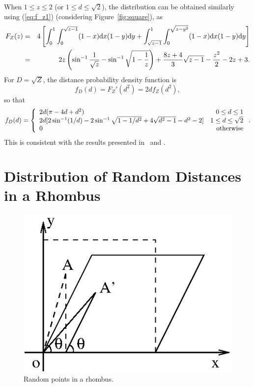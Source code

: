 \documentclass[12pt,draftclsnofoot,onecolumn]{IEEEtran}
\begin{document}
When $1\leq z\leq 2$ (or $1\leq d\leq\sqrt{2}$), the distribution can be obtained
similarly using (\ref{eq:f_z1}) (considering Figure~\ref{fig:square}), as
\begin{eqnarray}
F_Z(z)&=&4\left[\int_{0}^{1}\int_{0}^{\sqrt{z-1}}(1-x){\rm d}x(1-y){\rm
d}y+\int_{\sqrt{z-1}}^1\int_{0}^{\sqrt{z-y^2}}(1-x){\rm d}x(1-y){\rm d}y\right] \nonumber\\
&=&2z\left(\sin^{-1}\frac{1}{\sqrt{z}}-\sin^{-1}\sqrt{1-\frac{1}{z}}\right)+\frac{8z+4}{3}\sqrt{z-1}
-\frac{z^2}{2}-2z+3.\nonumber
\end{eqnarray}
For $D=\sqrt{Z}$, the distance probability density function is
\begin{equation}\label{eq:fd-fz}
f_D(d)=F_Z'(d^2)=2df_Z(d^2),
\end{equation}
so that
\begin{equation}
  f_{D}(d)=\left\{
    \begin{array}{lr}
      2d(\pi-4d+d^2) & 0\leq d\leq 1\\
      2d[2\sin^{-1}(1/d)-2\sin^{-1}\sqrt{1-1/d^2}+4\sqrt{d^2-1}-d^2-2] & 1\leq d\leq \sqrt{2} \\
      0 & {\rm otherwise} \nonumber
    \end{array}
  \right..
\end{equation}
This is consistent with the results presented in~\cite{ghosh1943distribution} and \cite{ghosh1943random}.

\section{Distribution of Random Distances in a Rhombus}\label{sec-withinr}

\begin{figure}
  \centering
  \includegraphics[width=0.4\columnwidth]{fig/single_rhombus}
  \caption{Random points in a rhombus.}
  \label{fig:rhombus}
\end{figure}
\end{document}
